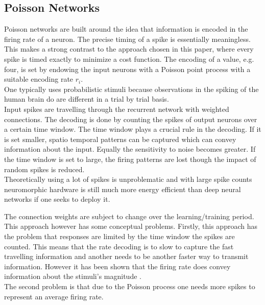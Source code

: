 \subsection{Poisson Networks}
Poisson networks are built around the idea that information is encoded in the firing rate of a neuron. The precise timing of a spike is essentially meaningless\cite{brette_philosophy_2015}. This makes a strong contrast to the approach chosen in this paper, where every spike is timed exactly to minimize a cost function.
The encoding of a value, e.g. four, is set by endowing the input neurons with a Poisson point process with a suitable encoding rate $r_i$\cite{deneve_efficient_2016}.\\
One typically uses probabilistic stimuli because observations in the spiking of the human brain do are different in a trial by trial basis.\\
Input spikes are travelling through the recurrent network with weighted connections. The decoding is done by counting the spikes of output neurons over a certain time window. The time window plays a crucial rule in the decoding. If it is set smaller, spatio temporal patterns can be captured which can convey information about the input. Equally the sensitivity to noise becomes greater. If the time window is set to large, the firing patterns are lost though the impact of random spikes is reduced.\\
Theoretically using a lot of spikes is unproblematic and with large spike counts neuromorphic hardware is still much more energy efficient than deep neural networks if one seeks to deploy it. 

The connection weights are subject to change over the learning/training period\cite{almomani_comparative_2019}.\\
This approach however has some conceptual problems. Firstly, this approach has the problem that responses are limited by the time window the spikes are counted\cite{andrew_spiking_2003}. This means that the rate decoding is to slow to capture the fast travelling information and another needs to be another  faster way to transmit information. However it has been shown that the firing rate does convey information about the stimuli's magnitude \cite{adrian_impulses_1926}.\\
The second problem is that due to the Poisson process one needs more spikes to represent an average firing rate.


